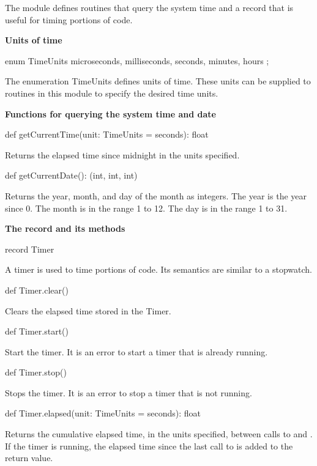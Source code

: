 The module  defines routines that query the system time and
a record  that is useful for timing portions of code.

{\bf Units of time}

\begin{chapel}
enum TimeUnits { microseconds, milliseconds, seconds, minutes, hours };
\end{chapel}
The enumeration TimeUnits defines units of time.  These units can be
supplied to routines in this module to specify the desired time units.

{\bf Functions for querying the system time and date}

\begin{chapel}
def getCurrentTime(unit: TimeUnits = seconds): float
\end{chapel}
Returns the elapsed time since midnight in the units specified.

\begin{chapel}
def getCurrentDate(): (int, int, int)
\end{chapel}
Returns the year, month, and day of the month as integers.  The year
is the year since 0.  The month is in the range 1 to 12.  The day is
in the range 1 to 31.

{\bf The  record and its methods}

\begin{chapel}
record Timer
\end{chapel}
A timer is used to time portions of code.  Its semantics are similar
to a stopwatch.

\begin{chapel}
def Timer.clear()
\end{chapel}
Clears the elapsed time stored in the Timer.

\begin{chapel}
def Timer.start()
\end{chapel}
Start the timer.  It is an error to start a timer that is already
running.

\begin{chapel}
def Timer.stop()
\end{chapel}
Stops the timer.  It is an error to stop a timer that is not running.

\begin{chapel}
def Timer.elapsed(unit: TimeUnits = seconds): float
\end{chapel}
Returns the cumulative elapsed time, in the units specified, between
calls to  and .  If the timer is running, the
elapsed time since the last call to  is added to the
return value.
